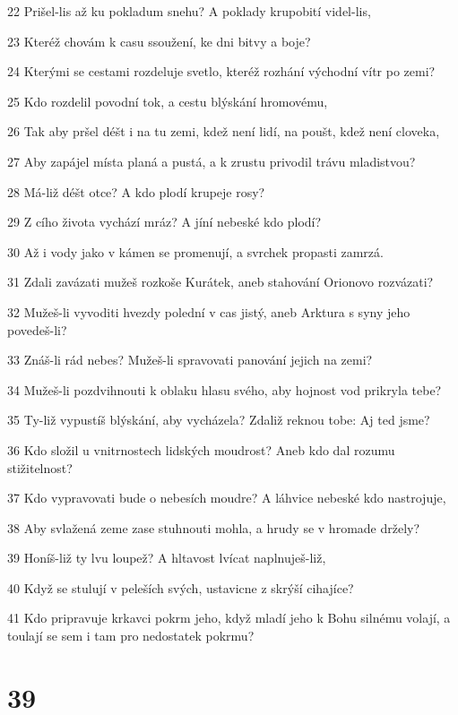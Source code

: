 \par 22 Prišel-lis až ku pokladum snehu? A poklady krupobití videl-lis,
\par 23 Kteréž chovám k casu ssoužení, ke dni bitvy a boje?
\par 24 Kterými se cestami rozdeluje svetlo, kteréž rozhání východní vítr po zemi?
\par 25 Kdo rozdelil povodní tok, a cestu blýskání hromovému,
\par 26 Tak aby pršel déšt i na tu zemi, kdež není lidí, na poušt, kdež není cloveka,
\par 27 Aby zapájel místa planá a pustá, a k zrustu privodil trávu mladistvou?
\par 28 Má-liž déšt otce? A kdo plodí krupeje rosy?
\par 29 Z cího života vychází mráz? A jíní nebeské kdo plodí?
\par 30 Až i vody jako v kámen se promenují, a svrchek propasti zamrzá.
\par 31 Zdali zavázati mužeš rozkoše Kurátek, aneb stahování Orionovo rozvázati?
\par 32 Mužeš-li vyvoditi hvezdy polední v cas jistý, aneb Arktura s syny jeho povedeš-li?
\par 33 Znáš-li rád nebes? Mužeš-li spravovati panování jejich na zemi?
\par 34 Mužeš-li pozdvihnouti k oblaku hlasu svého, aby hojnost vod prikryla tebe?
\par 35 Ty-liž vypustíš blýskání, aby vycházela? Zdaliž reknou tobe: Aj ted jsme?
\par 36 Kdo složil u vnitrnostech lidských moudrost? Aneb kdo dal rozumu stižitelnost?
\par 37 Kdo vypravovati bude o nebesích moudre? A láhvice nebeské kdo nastrojuje,
\par 38 Aby svlažená zeme zase stuhnouti mohla, a hrudy se v hromade držely?
\par 39 Honíš-liž ty lvu loupež? A hltavost lvícat naplnuješ-liž,
\par 40 Když se stulují v peleších svých, ustavicne z skrýší cihajíce?
\par 41 Kdo pripravuje krkavci pokrm jeho, když mladí jeho k Bohu silnému volají, a toulají se sem i tam pro nedostatek pokrmu?

\chapter{39}

